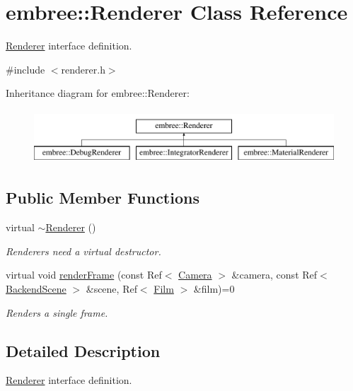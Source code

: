 \hypertarget{classembree_1_1_renderer}{
\section{embree::Renderer Class Reference}
\label{classembree_1_1_renderer}
}


\hyperlink{classembree_1_1_renderer}{Renderer} interface definition.  




{\ttfamily \#include $<$renderer.h$>$}

Inheritance diagram for embree::Renderer:\begin{figure}[H]
\begin{center}
\leavevmode
\includegraphics[height=2.000000cm]{classembree_1_1_renderer}
\end{center}
\end{figure}
\subsection*{Public Member Functions}
\begin{DoxyCompactItemize}
\item 
virtual \hyperlink{classembree_1_1_renderer_a88d280c02b4796ad680cc56c4aa9a5d6}{$\sim$Renderer} ()
\begin{DoxyCompactList}\small\item\em Renderers need a virtual destructor. \item\end{DoxyCompactList}\item 
virtual void \hyperlink{classembree_1_1_renderer_acefb5f55e45bc9b846e1619977926529}{renderFrame} (const Ref$<$ \hyperlink{classembree_1_1_camera}{Camera} $>$ \&camera, const Ref$<$ \hyperlink{classembree_1_1_backend_scene}{BackendScene} $>$ \&scene, Ref$<$ \hyperlink{classembree_1_1_film}{Film} $>$ \&film)=0
\begin{DoxyCompactList}\small\item\em Renders a single frame. \item\end{DoxyCompactList}\end{DoxyCompactItemize}


\subsection{Detailed Description}
\hyperlink{classembree_1_1_renderer}{Renderer} interface definition. 

